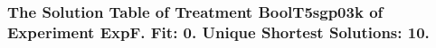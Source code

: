  \begin{frame}
 \fontsize{8pt}{9pt}\selectfont
 \frametitle{ The Solution Table of Treatment BoolT5sgp03k of Experiment ExpF. Fit: 0. Unique Shortest Solutions: 10. }

 \label{ExpFSolutionTable001.tex}  
 \end{frame}

